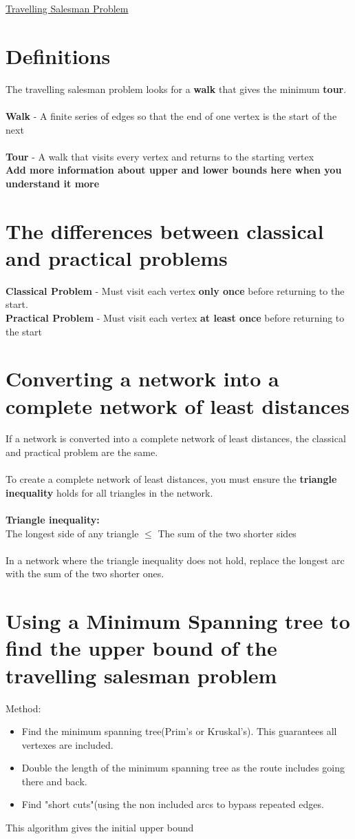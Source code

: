 \documentclass{article}[18pt]
\begin{document}
\begin{center}
\underline{\huge Travelling Salesman Problem}
\end{center}
\section{Definitions}
The travelling salesman problem looks for a \textbf{walk} that gives the minimum \textbf{tour}.\\
\\
\textbf{Walk} - A finite series of edges so that the end of one vertex is the start of the next\\
\\
\textbf{Tour} - A walk that visits every vertex and returns to the starting vertex
\\
\textbf{Add more information about upper and lower bounds here when you understand it more}
\section{The differences between classical and practical problems}
\textbf{Classical Problem} - Must visit each vertex \textbf{only once} before returning to the start.\\
\textbf{Practical Problem} - Must visit each vertex \textbf{at least once} before returning to the start
\section{Converting a network into a complete network of least distances}
If a network is converted into a complete network of least distances, the classical and practical problem are the same.\\
\\
To create a complete network of least distances, you must ensure the \textbf{triangle inequality} holds for all triangles in the network.\\
\\
\textbf{Triangle inequality:}\\
The longest side of any triangle $\leqslant$ The sum of the two shorter sides\\
\\
In a network where the triangle inequality does not hold, replace the longest arc with the sum of the two shorter ones.
\section{Using a Minimum Spanning tree to find the upper bound of the travelling salesman problem}
Method:
\begin{itemize}
\item Find the minimum spanning tree(Prim's or Kruskal's). This guarantees all vertexes are included.
\item Double the length of the minimum spanning tree as the route includes going there and back.
\item Find "short cuts"(using the non included arcs to bypass repeated edges.
\end{itemize}
This algorithm gives the initial upper bound
\end{document}

